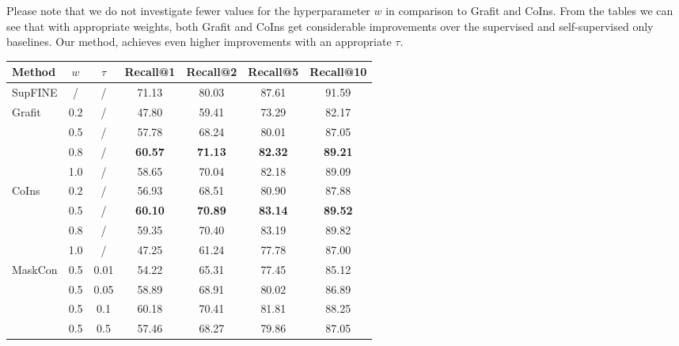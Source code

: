\documentclass[10pt,twocolumn,letterpaper]{article}
\begin{document}
Please note that we do not investigate fewer values for the hyperparameter $w$ in comparison to Grafit and CoIns. From the tables we can see that with appropriate weights, both Grafit and CoIns get considerable improvements over the supervised and self-supervised only baselines. Our method, achieves even higher improvements with an appropriate $\tau$.
\begin{table}[htbp]
\centering
\begin{tabular}{@{}l|c|c|cccc@{}}
\toprule
Method                  & $w$ & $\tau$ & Recall@1       & Recall@2       & Recall@5       & Recall@10      \\ \midrule
SupFINE                 & /   & /      & 71.13          & 80.03          & 87.61          & 91.59          \\ \midrule
\multirow{4}{*}{Grafit} & 0.2 & /      & 47.80          & 59.41          & 73.29          & 82.17          \\
                        & 0.5 & /      & 57.78          & 68.24          & 80.01          & 87.05          \\
                        & 0.8 & /      & \textbf{60.57} & \textbf{71.13} & \textbf{82.32} & \textbf{89.21} \\
                        & 1.0 & /      & 58.65          & 70.04          & 82.18          & 89.09          \\ \midrule
\multirow{4}{*}{CoIns}  & 0.2 & /      & 56.93          & 68.51          & 80.90          & 87.88          \\
                        & 0.5 & /      & \textbf{60.10} & \textbf{70.89} & \textbf{83.14} & \textbf{89.52} \\
                        & 0.8 & /      & 59.35          & 70.40          & 83.19          & 89.82          \\
                        & 1.0 & /      & 47.25          & 61.24          & 77.78          & 87.00          \\ \midrule
MaskCon                 & 0.5 & 0.01   & 54.22          & 65.31          & 77.45          & 85.12          \\
                        & 0.5 & 0.05   & 58.89          & 68.91          & 80.02          & 86.89          \\
                        & 0.5 & 0.1    & 60.18          & 70.41          & 81.81          & 88.25          \\
                        & 0.5 & 0.5    & 57.46          & 68.27          & 79.86          & 87.05          \\

\end{tabular}
\end{table}
\end{document}

